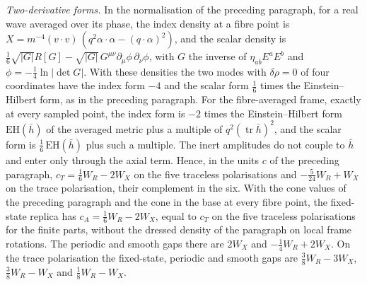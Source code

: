 \emph{Two-derivative forms.} In the normalisation of the preceding paragraph, for a real wave averaged over its phase, the index density at a fibre point is \(X=m^{-4}(v\cdot v)\,(q^2\alpha\cdot\alpha-(q\cdot\alpha)^2)\), and the scalar density is \(\tfrac16\sqrt{|G|}R[G]-\sqrt{|G|}\,G^{\mu\nu}\partial_\mu\phi\,\partial_\nu\phi\), with \(G\) the inverse of \(\eta_{ab}E^aE^b\) and \(\phi=-\tfrac14\ln|\det G|\). With these densities the two modes with \(\delta\rho=0\) of four coordinates have the index form \(-4\) and the scalar form \(\tfrac16\) times the Einstein--Hilbert form, as in the preceding paragraph. For the fibre-averaged frame, exactly at every sampled point, the index form is \(-2\) times the Einstein--Hilbert form \(\mathrm{EH}(\bar h)\) of the averaged metric plus a multiple of \(q^2(\operatorname{tr}\bar h)^2\), and the scalar form is \(\tfrac16\,\mathrm{EH}(\bar h)\) plus such a multiple. The inert amplitudes do not couple to \(\bar h\) and enter only through the axial term. Hence, in the units \(c\) of the preceding paragraph, \(c_T=\tfrac16W_R-2W_X\) on the five traceless polarisations and \(-\tfrac5{24}W_R+W_X\) on the trace polarisation, their complement in the six. With the cone values of the preceding paragraph and the cone in the base at every fibre point, the fixed-state replica has \(c_A=\tfrac16W_R-2W_X\), equal to \(c_T\) on the five traceless polarisations for the finite parts, without the dressed density of the paragraph on local frame rotations. The periodic and smooth gaps there are \(2W_X\) and \(-\tfrac14W_R+2W_X\). On the trace polarisation the fixed-state, periodic and smooth gaps are \(\tfrac38W_R-3W_X\), \(\tfrac38W_R-W_X\) and \(\tfrac18W_R-W_X\).

